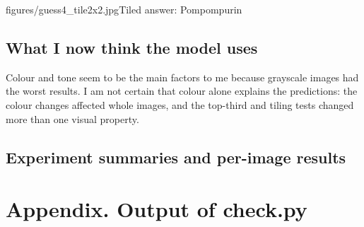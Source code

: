 \documentclass[11pt]{article}
\begin{document}
           {figures/guess4_tile2x2.jpg}{Tiled answer: Pompompurin}

\subsection*{What I now think the model uses}
Colour and tone seem to be the main factors to me because grayscale images
had the worst results. I am not certain that colour alone explains the
predictions: the colour changes affected whole images, and the top-third and
tiling tests changed more than one visual property.

\subsection*{Experiment summaries and per-image results}

\section*{Appendix. Output of check.py}
\end{document}
